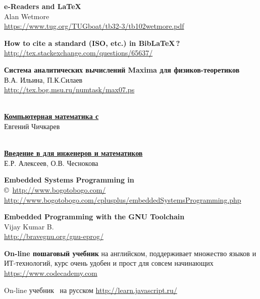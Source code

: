 \begin{thebibliography}{99}
\textbf{e-Readers and \LaTeX}\\
Alan Wetmore\\
\url{https://www.tug.org/TUGboat/tb32-3/tb102wetmore.pdf}

\textbf{How to cite a standard (ISO, etc.) in Bib\LaTeX\,?}\\
\url{http://tex.stackexchange.com/questions/65637/}


\textbf{Система аналитических вычислений Maxima для физиков-теоретиков}\\
В.А. Ильина, П.К.Силаев\\
\url{http://tex.bog.msu.ru/numtask/max07.ps}

\ \\
\href{http://shop.altlinux.ru/index.php?productID=750}{\textbf{Компьютерная
математика с }}\\
Евгений Чичкарев

\ \\
\href{http://shop.altlinux.ru/index.php?productID=751}{\textbf{Введение в
 для инженеров и математиков}}\\
Е.Р. Алексеев, О.В. Чеснокова 




\textbf{Embedded Systems Programming in \cpp}\\
\copyright\ \url{http://www.bogotobogo.com/}\\
\url{http://www.bogotobogo.com/cplusplus/embeddedSystemsProgramming.php}

\textbf{Embedded Programming with the GNU Toolchain}\\
Vijay Kumar B.\\
\url{http://bravegnu.org/gnu-eprog/}


\textbf{On-line пошаговый учебник \js} на английском, поддерживает множество
языков и ИТ-технологий, курс очень удобен и прост для совсем начинающих
\url{https://www.codecademy.com}

On-line учебник \js\ на русском
\url{http://learn.javascript.ru/}


\end{thebibliography}

